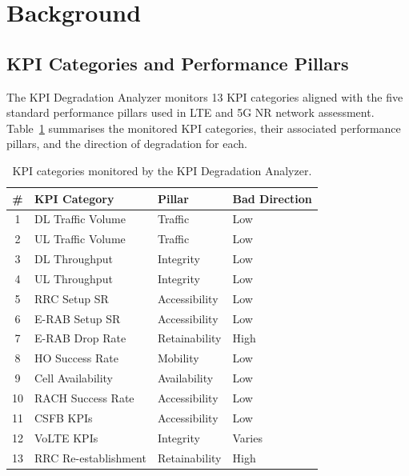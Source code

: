 \section{Background}

\subsection{KPI Categories and Performance Pillars}

The KPI Degradation Analyzer monitors 13 KPI categories aligned with the five standard performance pillars used in LTE and 5G NR network assessment. Table~\ref{tab:kpi_categories} summarises the monitored KPI categories, their associated performance pillars, and the direction of degradation for each.

\begin{table}[H]
    \centering
    \caption{KPI categories monitored by the KPI Degradation Analyzer.}
    \label{tab:kpi_categories}
    \begin{tabular}{|c|l|l|l|}
        \hline
        \textbf{\#} & \textbf{KPI Category} & \textbf{Pillar} & \textbf{Bad Direction} \\
        \hline
        1  & DL Traffic Volume    & Traffic         & Low  \\
        2  & UL Traffic Volume    & Traffic         & Low  \\
        3  & DL Throughput        & Integrity       & Low  \\
        4  & UL Throughput        & Integrity       & Low  \\
        5  & RRC Setup SR         & Accessibility   & Low  \\
        6  & E-RAB Setup SR       & Accessibility   & Low  \\
        7  & E-RAB Drop Rate      & Retainability   & High \\
        8  & HO Success Rate      & Mobility        & Low  \\
        9  & Cell Availability    & Availability    & Low  \\
        10 & RACH Success Rate    & Accessibility   & Low  \\
        11 & CSFB KPIs            & Accessibility   & Low  \\
        12 & VoLTE KPIs           & Integrity       & Varies \\
        13 & RRC Re-establishment & Retainability   & High \\
        \hline
    \end{tabular}
\end{table}

